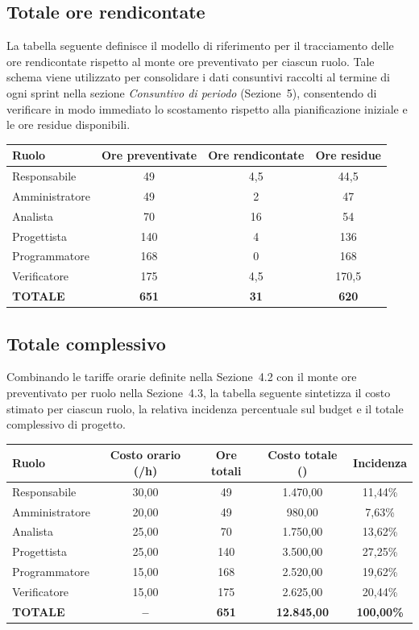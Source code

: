\subsection{Totale ore rendicontate}
La tabella seguente definisce il modello di riferimento per il tracciamento delle ore rendicontate rispetto al monte ore preventivato per ciascun ruolo. Tale schema viene utilizzato per consolidare i dati consuntivi raccolti al termine di ogni sprint nella sezione \textit{Consuntivo di periodo} (Sezione~5), consentendo di verificare in modo immediato lo scostamento rispetto alla pianificazione iniziale e le ore residue disponibili.

\vspace{2mm}
\renewcommand{\arraystretch}{1.3}
\noindent
\begin{tabularx}{\textwidth}{|X c c c|}
\hline
\textbf{Ruolo} & \textbf{Ore preventivate} & \textbf{Ore rendicontate} & \textbf{Ore residue} \\
\hline
Responsabile & 49 & 4,5 & 44,5 \\
Amministratore & 49 & 2 & 47 \\
Analista & 70 & 16 & 54 \\
Progettista & 140 & 4 & 136 \\
Programmatore & 168 & 0 & 168 \\
Verificatore & 175 & 4,5 & 170,5 \\
\hline
\textbf{TOTALE} & \textbf{651} & \textbf{31} & \textbf{620} \\
\hline
\end{tabularx}

\newpage
\subsection{Totale complessivo}
Combinando le tariffe orarie definite nella Sezione~4.2 con il monte ore preventivato per ruolo nella Sezione~4.3, la tabella seguente sintetizza il costo stimato per ciascun ruolo, la relativa incidenza percentuale sul budget e il totale complessivo di progetto.

\vspace{2mm}
\renewcommand{\arraystretch}{1.3}
\noindent
\begin{tabularx}{\textwidth}{|X c c c c|}
\hline
\textbf{Ruolo} & \textbf{Costo orario (\texteuro{}/h)} & \textbf{Ore totali} & \textbf{Costo totale (\texteuro{})} & \textbf{Incidenza} \\
\hline
Responsabile & 30,00 & 49 & 1.470,00 & 11,44\% \\
Amministratore & 20,00 & 49 & 980,00 & 7,63\% \\
Analista & 25,00 & 70 & 1.750,00 & 13,62\% \\
Progettista & 25,00 & 140 & 3.500,00 & 27,25\% \\
Programmatore & 15,00 & 168 & 2.520,00 & 19,62\% \\
Verificatore & 15,00 & 175 & 2.625,00 & 20,44\% \\
\hline
\textbf{TOTALE} & \textbf{--} & \textbf{651} & \textbf{12.845,00} & \textbf{100,00\%} \\
\hline
\end{tabularx}

